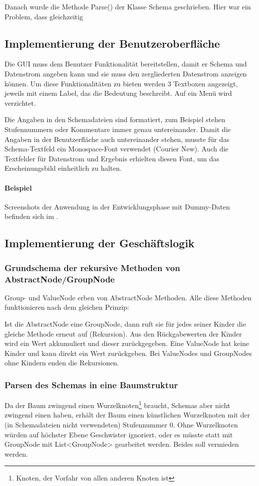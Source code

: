 Danach wurde die Methode Parse() der Klasse Schema geschrieben. Hier war ein Problem, dass gleichzeitig 


\subsection{Implementierung der Benutzeroberfläche}
\label{sec:ImplementierungBenutzeroberflaeche}
Die \ac{GUI} muss dem Benutzer Funktionalität bereitstellen, damit er Schema und Datenstrom angeben kann und sie muss den zergliederten Datenstrom anzeigen können.
Um diese Funktionalitäten zu bieten werden 3 Textboxen angezeigt, jeweils mit einem Label, das die Bedeutung beschreibt. Auf ein Menü wird verzichtet.

Die Angaben in den Schemadateien sind formatiert, zum Beispiel stehen Stufennummern oder Kommentare immer genau untereinander. Damit die Angaben in der Benutzerfläche auch untereinander stehen, musste für das Schema-Textfeld ein Monospace-Font verwendet (Courier New). Auch die Textfelder für Datenstrom und Ergebnis erhielten diesen Font, um das Erscheinungsbild einheitlich zu halten.
\paragraph{Beispiel}
Screenshots der Anwendung in der Entwicklungsphase mit Dummy-Daten befinden sich im .


\subsection{Implementierung der Geschäftslogik}
\label{sec:ImplementierungGeschaeftslogik}

\subsubsection{Grundschema der rekursive Methoden von AbstractNode/GroupNode}
Group- und ValueNode erben von AbstractNode Methoden. Alle diese Methoden funktionieren nach dem gleichen Prinzip:

Ist die AbstractNode eine GroupNode, dann ruft sie für jedes seiner Kinder die gleiche Methode erneut auf (Rekursion). Aus den Rückgabewerten der Kinder wird ein Wert akkumuliert und dieser zurückgegeben.
Eine ValueNode hat keine Kinder und kann direkt ein Wert zurückgeben. Bei ValueNodes und GroupNodes ohne Kindern enden die Rekursionen.



\subsubsection{Parsen des Schemas in eine Baumstruktur}
Da der Baum zwingend einen Wurzelknoten\footnote{Knoten, der Vorfahr von allen anderen Knoten ist} braucht, Schemas aber nicht zwingend einen haben, erhält der Baum einen künstlichen Wurzelknoten mit der (in Schemadateien nicht verwendeten) Stufennummer 0. Ohne Wurzelknoten würden auf höchster Ebene Geschwister ignoriert, oder es müsste statt mit GroupNode mit List<GroupNode> gearbeitet werden. Beides soll vermieden werden.

